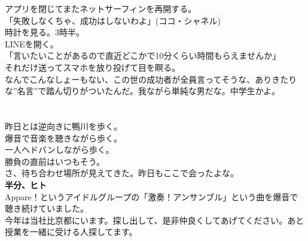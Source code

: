 \begin{myboxnote}
アプリを閉じてまたネットサーフィンを再開する。\\
「失敗しなくちゃ、成功はしないわよ」(ココ・シャネル)\\
時計を見る。3時半。\\
LINEを開く。\\
「言いたいことがあるので直近どこかで10分くらい時間もらえませんか」\\
それだけ送ってスマホを放り投げて目を瞑る。\\
なんでこんなしょーもない、この世の成功者が全員言ってそうな、ありきたりな”名言”で踏ん切りがついたんだ。我ながら単純な男だな。中学生かよ。\\
　\\
　\\
昨日とは逆向きに鴨川を歩く。\\
爆音で音楽を聴きながら歩く。\\
一人ヘドバンしながら歩く。\\
勝負の直前はいつもそう。\\
さ、待ち合わせ場所が見えてきた。昨日もここで会ったよな。\\


\vspace{1mm}
\noindent
\textbf{半分、ヒト}\\
Appare！というアイドルグループの「激奏！アンサンブル」という曲を爆音で聴き続けていました。\\
今年は当社比京都にいます。探し出して、是非仲良くしてあげてください。あと授業を一緒に受ける人探してます。

\end{myboxnote}
\vspace{1em}

